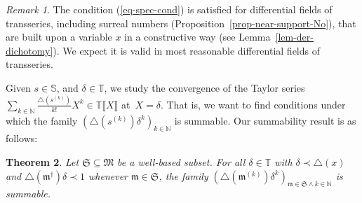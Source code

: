\documentclass{article}
\newtheorem{theorem}{Theorem}[section]
\theoremstyle{remark}\newtheorem*{convention*}{Convention}
\newtheorem{remark}[theorem]{Remark}
\begin{document}
\begin{remark}
  The condition (\ref{eq-spec-cond}) is satisfied for differential fields of
  transseries, including surreal numbers (Proposition~\ref{prop-near-support-No}), that
  are built upon a variable $x$ in a constructive way (see
  Lemma~\ref{lem-der-dichotomy}). We expect it is valid in most reasonable
  differential fields of transseries.
\end{remark}

Given $s \in \mathbb{S}$, and $\delta \in \mathbb{T}$, we study the
convergence of the Taylor series $\sum_{k \in \mathbb{N}} \frac{\triangle
(s^{(k)})}{k!} X^k \in \mathbb{T} \llbracket X \rrbracket$ at~$X = \delta$.
That is, we want to find conditions under which the family $(\triangle
(s^{(k)}) \delta^k)_{k \in \mathbb{N}}$ is summable. Our summability result is
as follows:

\begin{theorem}
  \label{th-Taylor-convergence}Let $\mathfrak{S} \subseteq \mathfrak{M}$ be a
  well-based subset. For all $\delta \in \mathbb{T}$ with $\delta \prec
  \triangle (x)$ and $\triangle (\mathfrak{m}^{\dag}) \delta \prec 1$ whenever
  $\mathfrak{m} \in \mathfrak{S}$, the family $(\triangle (\mathfrak{m}^{(k)})
  \delta^k)_{\mathfrak{m} \in \mathfrak{S} \wedge k \in \mathbb{N}}$ is
  summable.
\end{theorem}
\end{document}
